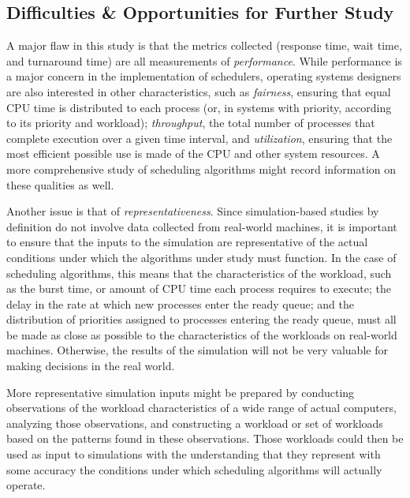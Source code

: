 \documentclass[12pt,letterpaper]{article}
\begin{document}
  		\subsection{Difficulties \& Opportunities for Further Study}
  			A major flaw in this study is that the metrics collected (response time, wait time, and turnaround time) are all measurements of \textit{performance}. While performance is a major concern in the implementation of schedulers, operating systems designers are also interested in other characteristics, such as \textit{fairness}, ensuring that equal CPU time is distributed to each process (or, in systems with priority, according to its priority and workload); \textit{throughput}, the total number of processes that complete execution over a given time interval, and \textit{utilization}, ensuring that the most efficient possible use is made of the CPU and other system resources. A more comprehensive study of scheduling algorithms might record information on these qualities as well.

  			Another issue is that of \textit{representativeness}. Since  simulation-based studies by definition do not involve data collected from real-world machines, it is important to ensure that the inputs to the simulation are representative of the actual conditions under which the algorithms under study must function. In the case of scheduling algorithms, this means that the characteristics of the workload, such as the burst time, or amount of CPU time each process requires to execute; the delay in the rate at which new processes enter the ready queue; and the distribution of priorities assigned to processes entering the ready queue, must all be made as close as possible to the characteristics of the workloads on real-world machines. Otherwise, the results of the simulation will not be very valuable for making decisions in the real world.

  			More representative simulation inputs might be prepared by conducting observations of the workload characteristics of a wide range of actual computers, analyzing those observations, and constructing a workload or set of workloads based on the patterns found in these observations. Those workloads could then be used as input to simulations with the understanding that they represent with some accuracy the conditions under which scheduling algorithms will actually operate.
\end{document}
